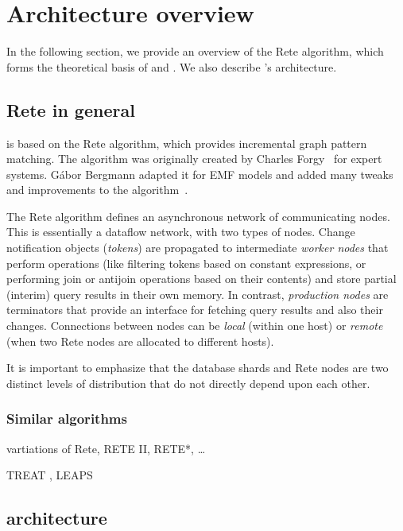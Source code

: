 \section{Architecture overview}
\label{sec:architecture}

In the following section, we provide an overview of the Rete algorithm, which forms the theoretical basis of \eiq{} and \iqd{}. We also describe \iqd{}'s architecture.

\subsection{Rete in general}
\label{subsec:rete}

\iqd{} is based on the Rete algorithm, which provides incremental graph pattern matching. The algorithm was originally created by Charles Forgy~\cite{Forgy} for expert systems. Gábor Bergmann adapted it for EMF models and added many tweaks and improvements to the algorithm~\cite{BergmannRete}.

The Rete algorithm defines an asynchronous network of communicating nodes. This is essentially a dataflow network, with two types of nodes. Change notification objects (\emph{tokens}) are propagated to intermediate \emph{worker nodes} that perform operations (like filtering tokens based on constant expressions, or performing join or antijoin operations based on their contents) and store partial (interim) query results in their own memory. In contrast, \emph{production nodes} are terminators that provide an interface for fetching query results and also their changes. Connections between nodes can be \emph{local} (within one host) or \emph{remote} (when two Rete nodes are allocated to different hosts).

It is important to emphasize that the database shards and Rete nodes are two distinct levels of distribution that do not directly depend upon each other.

\subsubsection{Similar algorithms}

vartiations of Rete, RETE II, RETE*, \ldots

TREAT \cite{Miranker:1991:OPT:627280.627434}, LEAPS \cite{Batory:1994:LA:899216}

\subsection{\iqd{} architecture}

